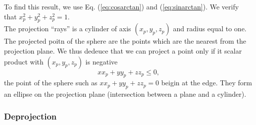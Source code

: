     To find this result, we use Eq. (\ref{eq:cosarctan}) and (\ref{eq:sinarctan}).
    We verify that $x_p^2 + y_p^2 + z_p^2 = 1$.\\
    The projection ``rays'' is a cylinder of axis $(x_p, y_p, z_p)$ and radius equal to one.
    The projected poitn of the sphere are the points which are the nearest from the projection plane.
    We thus dedeuce that we can project a point only if it scalar product with $(x_p, y_p, z_p)$ is negative
    \begin{equation}
      x x_p + y y_p + z z_p \le 0,
    \end{equation}
    the point of the sphere such as $x x_p + y y_p + z z_p = 0$ beigin at the edge.
    They form an ellipse on the projection plane (intersection between a plane and a cylinder).

  \subsubsection{Deprojection}

